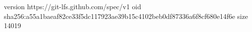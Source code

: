 version https://git-lfs.github.com/spec/v1
oid sha256:a55a1baeaf82ce33f5dc117923ae39b15c4102beb0df87336a6f8cf680e14f6e
size 14019
